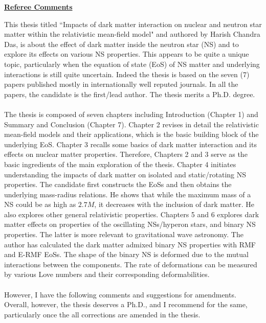 \documentclass[aps,preprint,showpacs,amsmath,amssymb,prc,floatfix,nofootinbib]{revtex4-1}
\begin{document}
\begin{center}
    \textbf{\underline{Referee Comments}}
\end{center}
This thesis titled ``Impacts of dark matter interaction on nuclear and neutron
star matter within the relativistic mean-field model" and authored by Harish
Chandra Das, is about the effect of dark matter inside the neutron star (NS)
and to explore its effects on various NS properties. This appears to be quite a
unique topic, particularly when the equation of state (EoS) of NS matter and
underlying interactions is still quite uncertain. Indeed the thesis is based on the seven (7) papers published mostly in internationally well reputed journals. In
all the papers, the candidate is the first/lead author. The thesis merits a Ph.D.
degree.
\\
\\
The thesis is composed of seven chapters including Introduction (Chapter 1) and Summary and Conclusion (Chapter 7). Chapter 2 revises in detail the relativistic mean-field models and their applications, which is the basic building block of the underlying EoS. Chapter 3 recalls some basics of dark matter interaction and its effects on nuclear matter properties. Therefore, Chapters 2 and 3 serve as the basic ingredients of the main exploration of the thesis. Chapter 4 initiates understanding the impacts of dark matter on isolated and static/rotating NS properties. The candidate first constructs the EoSs and then obtains the underlying mass-radius relations. He shows that while the maximum mass of a NS could be as high as $2.7M$, it decreases with the inclusion of dark matter. He also explores other general relativistic properties. Chapters 5 and 6 explores dark matter effects on properties of the oscillating NSs/hyperon stars, and binary NS properties. The latter is more relevant to gravitational wave astronomy. The author has calculated the dark matter admixed binary NS properties with RMF and E-RMF EoSs. The shape of the binary NS is deformed due to the mutual interactions between the components. The rate of deformations can be measured by various Love numbers and their corresponding deformabilities.
\\
\\
However, I have the following comments and suggestions for amendments. Overall, however, the thesis deserves a Ph.D., and I recommend for the same, particularly once the all corrections are amended in the thesis.
\\
\\
\end{document}
